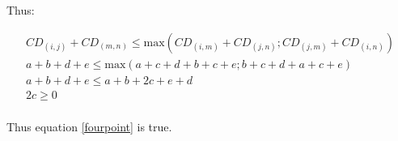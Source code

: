 \documentclass[12pt,letterpaper]{article}
\begin{document}
Thus:

\begin{equation}
    \begin{gathered}
    CD_{(i,j)} + CD_{(m,n)} \leq \text{max}{(CD_{(i,m)} + CD_{(j,n)} ; CD_{(j,m)} + CD_{(i,n)} )} \\ 
    a + b + d + e \leq \text{max} (a+c+d+b+c+e; b+c+d+a+c+e) \\
    a + b + d + e \leq a+b+2c+e+d \\
    2c \geq 0 \\
    \end{gathered}
\end{equation}

Thus equation \ref{fourpoint} is true.



\end{document}
